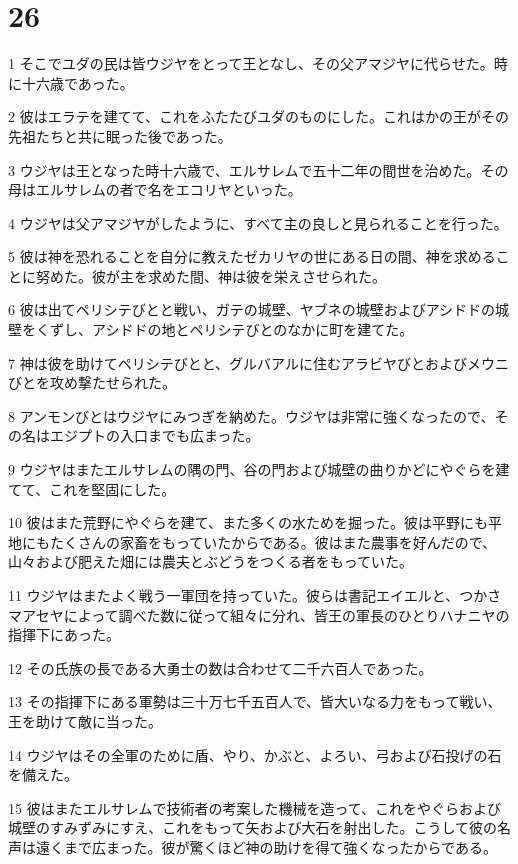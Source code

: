 \chapter{26}

\par 1 そこでユダの民は皆ウジヤをとって王となし、その父アマジヤに代らせた。時に十六歳であった。
\par 2 彼はエラテを建てて、これをふたたびユダのものにした。これはかの王がその先祖たちと共に眠った後であった。
\par 3 ウジヤは王となった時十六歳で、エルサレムで五十二年の間世を治めた。その母はエルサレムの者で名をエコリヤといった。
\par 4 ウジヤは父アマジヤがしたように、すべて主の良しと見られることを行った。
\par 5 彼は神を恐れることを自分に教えたゼカリヤの世にある日の間、神を求めることに努めた。彼が主を求めた間、神は彼を栄えさせられた。
\par 6 彼は出てペリシテびとと戦い、ガテの城壁、ヤブネの城壁およびアシドドの城壁をくずし、アシドドの地とペリシテびとのなかに町を建てた。
\par 7 神は彼を助けてペリシテびとと、グルバアルに住むアラビヤびとおよびメウニびとを攻め撃たせられた。
\par 8 アンモンびとはウジヤにみつぎを納めた。ウジヤは非常に強くなったので、その名はエジプトの入口までも広まった。
\par 9 ウジヤはまたエルサレムの隅の門、谷の門および城壁の曲りかどにやぐらを建てて、これを堅固にした。
\par 10 彼はまた荒野にやぐらを建て、また多くの水ためを掘った。彼は平野にも平地にもたくさんの家畜をもっていたからである。彼はまた農事を好んだので、山々および肥えた畑には農夫とぶどうをつくる者をもっていた。
\par 11 ウジヤはまたよく戦う一軍団を持っていた。彼らは書記エイエルと、つかさマアセヤによって調べた数に従って組々に分れ、皆王の軍長のひとりハナニヤの指揮下にあった。
\par 12 その氏族の長である大勇士の数は合わせて二千六百人であった。
\par 13 その指揮下にある軍勢は三十万七千五百人で、皆大いなる力をもって戦い、王を助けて敵に当った。
\par 14 ウジヤはその全軍のために盾、やり、かぶと、よろい、弓および石投げの石を備えた。
\par 15 彼はまたエルサレムで技術者の考案した機械を造って、これをやぐらおよび城壁のすみずみにすえ、これをもって矢および大石を射出した。こうして彼の名声は遠くまで広まった。彼が驚くほど神の助けを得て強くなったからである。

